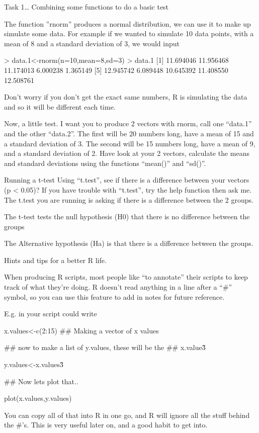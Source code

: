 \documentclass{article}
\begin{document}
Task 1… Combining some functions to do a basic test

The function ”rnorm” produces a normal distribution, we can use it to make up simulate some data.  For example if we wanted to simulate 10 data points, with a mean of 8 and a standard deviation of 3, we would input

> data.1<-rnorm(n=10,mean=8,sd=3)
> data.1
[1] 11.694046 11.956468 11.174013  6.000238  1.365149 
[5] 12.945742  6.089448 10.645392 11.408550 12.508761

Don’t worry if you don’t get the exact same numbers, R is simulating the data and so it will be different each time.

Now, a little test. I want you to produce 2 vectors with rnorm, call one “data.1” and the other “data.2”. The first will be 20 numbers long, have a mean of 15 and a standard deviation of 3. The second will be 15 numbers long, have a mean of 9, and a standard deviation of 2. Have look at your 2 vectors, calculate the means and standard deviations using the functions “mean()” and “sd()”.

Running a t-test
Using “t.test”, see if there is a difference between your vectors (p < 0.05)? If you have trouble with “t.test”, try the help function then ask me. The t.test you are running is asking if there is a difference between the 2 groups. 

The t-test tests the null hypothesis (H0) that there is no difference between the groups

The Alternative hypothesis (Ha) is that there is a difference between the groups. 

Hints and tips for a better R life.

When producing R scripts, most people like “to annotate” their scripts to keep track of what they’re doing. R doesn’t read anything in a line after a “\#” symbol, so you can use this feature to add in notes for future reference.

E.g. in your script could write

x.values<-c(2:15) \#\# Making a vector of x values

\#\# now to make a list of y.values, these will be the 
\#\# x.value\^3

y.values<-x.values\^3

\#\# Now lets plot that..

plot(x.values,y.values)

You can copy all of that into R in one go, and R will ignore all the stuff behind the \#’s. This is very useful later on, and a good habit to get into. 
\end{document}
